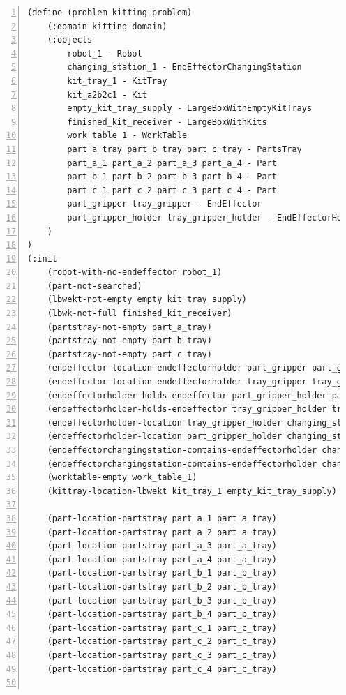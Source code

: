 \begin{center}
\begin{minipage}{.9\paperwidth}
\begin{mylisting}
\begin{Verbatim}[commandchars=\\\{\},fontsize=\scriptsize, numbers=left, numbersep=2pt]
(define (problem kitting-problem)
    (:domain kitting-domain)
    (:objects
        robot_1 - Robot
        changing_station_1 - EndEffectorChangingStation
        kit_tray_1 - KitTray
        kit_a2b2c1 - Kit
        empty_kit_tray_supply - LargeBoxWithEmptyKitTrays
        finished_kit_receiver - LargeBoxWithKits
        work_table_1 - WorkTable
        part_a_tray part_b_tray part_c_tray - PartsTray
        part_a_1 part_a_2 part_a_3 part_a_4 - Part
        part_b_1 part_b_2 part_b_3 part_b_4 - Part
        part_c_1 part_c_2 part_c_3 part_c_4 - Part
        part_gripper tray_gripper - EndEffector
        part_gripper_holder tray_gripper_holder - EndEffectorHolder
    )
)
(:init
    (robot-with-no-endeffector robot_1)
    (part-not-searched)
    (lbwekt-not-empty empty_kit_tray_supply)	
    (lbwk-not-full finished_kit_receiver)		
    (partstray-not-empty part_a_tray)
    (partstray-not-empty part_b_tray)
    (partstray-not-empty part_c_tray)
    (endeffector-location-endeffectorholder part_gripper part_gripper_holder)
    (endeffector-location-endeffectorholder tray_gripper tray_gripper_holder)
    (endeffectorholder-holds-endeffector part_gripper_holder part_gripper)
    (endeffectorholder-holds-endeffector tray_gripper_holder tray_gripper)
    (endeffectorholder-location tray_gripper_holder changing_station_1)
    (endeffectorholder-location part_gripper_holder changing_station_1)
    (endeffectorchangingstation-contains-endeffectorholder changing_station_1 tray_gripper_holder)	
    (endeffectorchangingstation-contains-endeffectorholder changing_station_1 part_gripper_holder)
    (worktable-empty work_table_1)
    (kittray-location-lbwekt kit_tray_1 empty_kit_tray_supply)

    (part-location-partstray part_a_1 part_a_tray)
    (part-location-partstray part_a_2 part_a_tray)
    (part-location-partstray part_a_3 part_a_tray)
    (part-location-partstray part_a_4 part_a_tray)
    (part-location-partstray part_b_1 part_b_tray)
    (part-location-partstray part_b_2 part_b_tray)
    (part-location-partstray part_b_3 part_b_tray)
    (part-location-partstray part_b_4 part_b_tray)
    (part-location-partstray part_c_1 part_c_tray)
    (part-location-partstray part_c_2 part_c_tray)
    (part-location-partstray part_c_3 part_c_tray)
    (part-location-partstray part_c_4 part_c_tray)
	

\end{Verbatim}
\end{mylisting}
\end{minipage}
\end{center}
